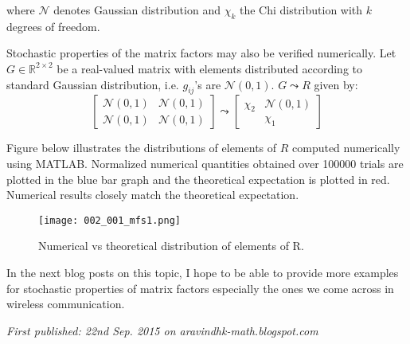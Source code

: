 where $\mathcal{N}$ denotes Gaussian distribution and $\chi_k$ the Chi distribution with $k$ degrees of freedom.

Stochastic properties of the matrix factors may also be verified numerically. Let $G \in \mathbb{R}^{2 \times 2}$ be a real-valued matrix with elements distributed according to standard Gaussian distribution, i.e. $g_{ij}$'s are $\mathcal{N}(0,1)$. $G \leadsto R$ given by:
$$
\begin{bmatrix}
	\mathcal{N}(0,1) & \mathcal{N}(0,1) \\
	\mathcal{N}(0,1) & \mathcal{N}(0,1)
\end{bmatrix} \leadsto
\begin{bmatrix}
	\chi_2 & \mathcal{N}(0,1) \\
	& \chi_1
\end{bmatrix}
$$

Figure below illustrates the distributions of elements of $R$ computed numerically using MATLAB. Normalized numerical quantities obtained over 100000 trials are plotted in the blue bar graph and the theoretical expectation is plotted in red. Numerical results closely match the theoretical expectation.

\begin{figure}[H]
	\centering
	\texttt{[image: 002\_001\_mfs1.png]}
	\caption{Numerical vs theoretical distribution of elements of R.}
\end{figure}

In the next blog posts on this topic, I hope to be able to provide more examples for stochastic properties of matrix factors especially the ones we come across in wireless communication.

\emph{First published: 22nd Sep. 2015 on aravindhk-math.blogspot.com}
